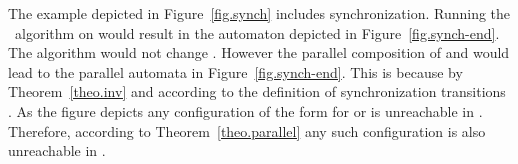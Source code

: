 \documentclass{eptcs}
\begin{document}
\begin{example}
\label{ex.synch}
The example depicted in Figure~\ref{fig.synch} includes synchronization.
Running the \cipm\ algorithm on  would result in the automaton 
depicted in Figure~\ref{fig.synch-end}. The algorithm would not change .
However the parallel composition of  and  would lead to the
parallel automata in Figure~\ref{fig.synch-end}. This is because by
Theorem~\ref{theo.inv}  and according to the
definition of synchronization transitions .  As the
figure depicts any configuration of the form  for  or
 is unreachable in .  Therefore, according to
Theorem~\ref{theo.parallel} any such configuration is also unreachable in
.






\begin{figure}[htb]
\begin{minipage}[h]{0.4\linewidth}
\center
{}
\end{minipage}
\end{figure}
\end{example}
\end{document}
